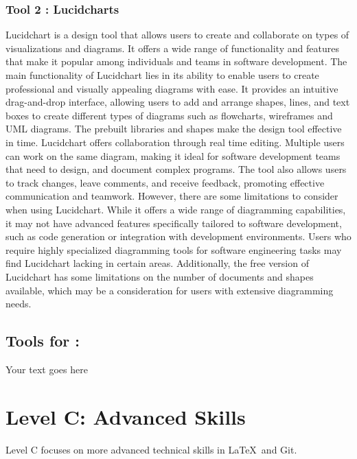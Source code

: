 \documentclass[a4paper, 11pt]{report}
\begin{document}
\subsubsection{Tool 2 : Lucidcharts}
Lucidchart is a design tool that allows users to create and collaborate on types of visualizations and diagrams. It offers a wide range of functionality and features that make it popular among individuals and teams in software development.   \cite{lucidchart} The main functionality of Lucidchart lies in its ability to enable users to create professional and visually appealing diagrams with ease. It provides an intuitive drag-and-drop interface, allowing users to add and arrange shapes, lines, and text boxes to create different types of diagrams such as flowcharts, wireframes and UML diagrams. The prebuilt libraries and shapes make the design tool effective in time. Lucidchart offers collaboration through real time editing. Multiple users can work on the same diagram, making it ideal for software development teams that need to design, and document complex programs. The tool also allows users to track changes, leave comments, and receive feedback, promoting effective communication and teamwork. However, there are some limitations to consider when using Lucidchart. While it offers a wide range of diagramming capabilities, it may not have advanced features specifically tailored to software development, such as code generation or integration with development environments. Users who require highly specialized diagramming tools for software engineering tasks may find Lucidchart lacking in certain areas. Additionally, the free version of Lucidchart has some limitations on the number of documents and shapes available, which may be a consideration for users with extensive diagramming needs.

\subsection{Tools for \majD: \studD}

Your text goes here



\newpage
\section{Level C: Advanced Skills}

Level C focuses on more advanced technical skills in \LaTeX\ and Git.
\end{document}
